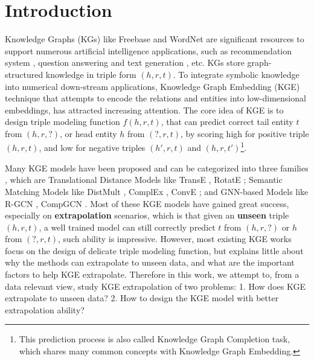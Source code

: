\documentclass[letterpaper]{article} \usepackage{aaai22}  \usepackage{times}  \usepackage{helvet}  \usepackage{courier}  \usepackage[hyphens]{url}  \usepackage{graphicx} \urlstyle{rm} \def\UrlFont{\rm}  \usepackage{natbib}  \usepackage{caption} \DeclareCaptionStyle{ruled}{labelfont=normalfont,labelsep=colon,strut=off} \frenchspacing  \setlength{\pdfpagewidth}{8.5in}  \setlength{\pdfpageheight}{11in}  \usepackage{algorithm}
\begin{document}
\section{Introduction}
Knowledge Graphs (KGs) like Freebase \cite{SIGMOD_2008_Bollacker_Freebase} and WordNet \cite{ACM_1995_Miller_WordNet} are significant resources to support numerous artificial intelligence applications, such as recommendation system \cite{CIKM_2018_Wang_RippleNet},  question answering \cite{Yasunaga_NAACL_2021_QA-GNN} and text generation \cite{ACL_2020_Zhang_Generation}, etc. KGs store graph-structured knowledge in triple form $(h, r, t)$. To integrate symbolic knowledge into numerical down-stream applications, Knowledge Graph Embedding (KGE) technique that attempts to encode the relations and entities into low-dimensional embeddings, has attracted increasing attention. 
The core idea of KGE is to design triple modeling function $f(h, r, t)$, that can predict correct tail entity $t$ from $(h, r, ?)$, or head entity $h$ from $(?, r, t)$, by scoring high for positive triple $(h, r, t)$, and low for negative triples $(h', r, t)$ and $(h, r, t')$\footnote{This prediction process is also called Knowledge Graph Completion task, which shares many common concepts with Knowledge Graph Embedding.}.

Many KGE models have been proposed and can be categorized into three families \cite{TKDE_2017_Wang_Survey, 2020_Arora_KG-GNN}, which are Translational Distance Models like TransE \cite{NeurIPS_2013_Bordes_TransE}, RotatE \cite{ICLR_2019_Sun_RotatE}; Semantic Matching Models like DistMult \cite{ICLR_2015_Yang_DistMult}, ComplEx \cite{ICML_2016_Trouillon_ComplEx}, ConvE \cite{AAAI_2018_Dettmers_ConvE_WN18RR}; and GNN-based Models like R-GCN \cite{ESWC_2018_Schlichtkrull_R-GCN}, CompGCN \cite{ICLR_2020_Vashishth_CompGCN}.  
Most of these KGE models have gained great success, especially on \textbf{extrapolation} scenarios, which is that given an \textbf{unseen} triple $(h, r, t)$, a well trained model can still correctly predict $t$ from $(h, r, ?)$ or $h$ from $(?, r, t)$, such ability is impressive.
However, most existing KGE works focus on the design of delicate triple modeling function, but explains little about why the methods can extrapolate to unseen data, and what are the important factors to help KGE extrapolate. Therefore in this work, we attempt to, from a data relevant view, study KGE extrapolation of two problems: 1. How does KGE extrapolate to unseen data? 2. How to design the KGE model with better extrapolation ability? 
\end{document}
